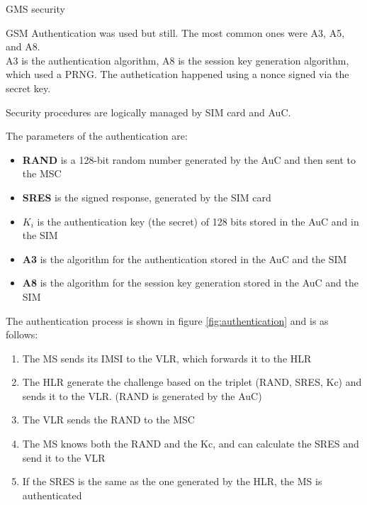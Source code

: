 \begin{section}{GMS security}
\begin{subsection}{GSM Authentication}
    was used but still. The most common ones were A3, A5, and A8.\\
    A3 is the authentication algorithm, A8 is the session key generation algorithm, which used a
    PRNG. The authetication happened using a nonce signed via the secret key.
    \begin{boxH}
      Security procedures are logically managed by SIM card and AuC.
    \end{boxH}
    The parameters of the authentication are:
    \begin{itemize}
      \item \textbf{RAND} is a 128-bit random number generated by the AuC and then sent to the MSC
      \item \textbf{SRES} is the signed response, generated by the SIM card
      \item \textbf{$K_i$} is the authentication key (the secret) of 128 bits stored in the AuC and
        in the SIM
      \item \textbf{A3} is the algorithm for the authentication stored in the AuC and the SIM
      \item \textbf{A8} is the algorithm for the session key generation stored in the AuC and the
        SIM
    \end{itemize}
    The authentication process is shown in figure \ref{fig:authentication} and is as follows:
    \begin{enumerate}
      \item The MS sends its IMSI to the VLR, which forwards it to the HLR
      \item The HLR generate the challenge based on the triplet (RAND, SRES, Kc) and sends it to the
        VLR. (RAND is generated by the AuC)
      \item The VLR sends the RAND to the MSC
      \item The MS knows both the RAND and the Kc, and can calculate the SRES and send it to the VLR
      \item If the SRES is the same as the one generated by the HLR, the MS is authenticated
    \end{enumerate}


\end{subsection}
\end{section}
